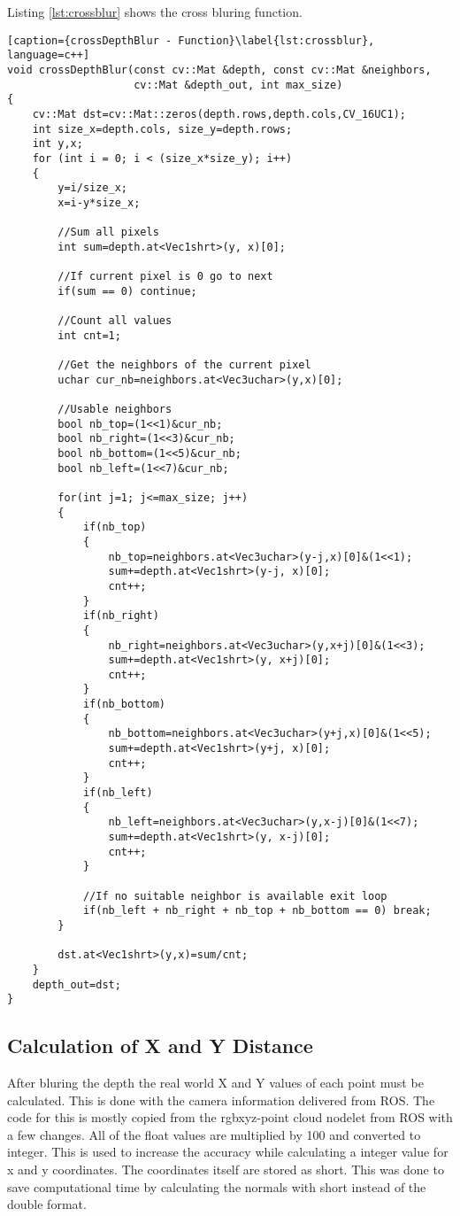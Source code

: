Listing \vref{lst:crossblur} shows the cross bluring function.

\begin{lstlisting}[caption={crossDepthBlur - Function}\label{lst:crossblur}, language=c++]
void crossDepthBlur(const cv::Mat &depth, const cv::Mat &neighbors, 
                    cv::Mat &depth_out, int max_size)
{
	cv::Mat dst=cv::Mat::zeros(depth.rows,depth.cols,CV_16UC1);
	int size_x=depth.cols, size_y=depth.rows;
	int y,x;
	for (int i = 0; i < (size_x*size_y); i++)
	{
		y=i/size_x;
		x=i-y*size_x;

		//Sum all pixels
		int sum=depth.at<Vec1shrt>(y, x)[0];

		//If current pixel is 0 go to next
		if(sum == 0) continue;

		//Count all values
		int cnt=1;

		//Get the neighbors of the current pixel
		uchar cur_nb=neighbors.at<Vec3uchar>(y,x)[0];

		//Usable neighbors
		bool nb_top=(1<<1)&cur_nb;
		bool nb_right=(1<<3)&cur_nb;
		bool nb_bottom=(1<<5)&cur_nb;
		bool nb_left=(1<<7)&cur_nb;

		for(int j=1; j<=max_size; j++)
		{
			if(nb_top)
			{
				nb_top=neighbors.at<Vec3uchar>(y-j,x)[0]&(1<<1);
				sum+=depth.at<Vec1shrt>(y-j, x)[0];
				cnt++;
			}
			if(nb_right)
			{
				nb_right=neighbors.at<Vec3uchar>(y,x+j)[0]&(1<<3);
				sum+=depth.at<Vec1shrt>(y, x+j)[0];
				cnt++;
			}
			if(nb_bottom)
			{
				nb_bottom=neighbors.at<Vec3uchar>(y+j,x)[0]&(1<<5);
				sum+=depth.at<Vec1shrt>(y+j, x)[0];
				cnt++;
			}
			if(nb_left)
			{
				nb_left=neighbors.at<Vec3uchar>(y,x-j)[0]&(1<<7);
				sum+=depth.at<Vec1shrt>(y, x-j)[0];
				cnt++;
			}

			//If no suitable neighbor is available exit loop
			if(nb_left + nb_right + nb_top + nb_bottom == 0) break;
		}

		dst.at<Vec1shrt>(y,x)=sum/cnt;
	}
	depth_out=dst;
}
\end{lstlisting}

\subsection{Calculation of X and Y Distance}
After bluring the depth the real world X and Y values of each point must be calculated. 
This is done with the camera information delivered from ROS. 
The code for this is mostly copied from the rgbxyz-point cloud nodelet from ROS with a few changes.
All of the float values are multiplied by 100 and converted to integer. This is used to increase the accuracy while
calculating a integer value for x and y coordinates. The coordinates itself are stored as short. This was done to save
computational time by calculating the normals with short instead of the double format.

